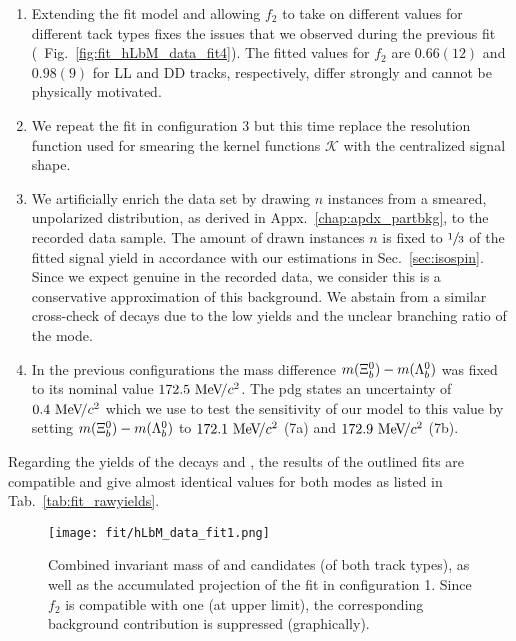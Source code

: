 \begin{enumerate}
    \item Extending the fit model and allowing $f_2$ to take on different values for different tack types fixes the issues that we observed during the previous fit (\cf{}~Fig.~\ref{fig:fit_hLbM_data_fit4}). The fitted values for $f_2$ are $0.66(12)$ and $0.98(9)$ for \gls{LL} and \gls{DD} tracks, respectively, differ strongly and cannot be physically motivated.
    \item We repeat the fit in configuration 3 but this time replace the resolution function used for smearing the \Dstarz kernel functions $\mathcal{K}$ with the centralized \Xibz signal shape.
    \item We artificially enrich the data set by drawing $n$ instances from a smeared, unpolarized \decay{\Lb}{\Dz\Sz} distribution, as derived in Appx.~\ref{chap:apdx_partbkg}, to the recorded data sample. The amount of drawn instances $n$ is fixed to $\sfrac{1}{3}$ of the fitted \Lb signal yield in accordance with our estimations in Sec.~\ref{sec:isospin}. Since we expect genuine \decay{\Lb}{\Dz\Sz} in the recorded data, we consider this is a conservative approximation of this background. We abstain from a similar cross-check of \decay{\Xibz}{\Dz\Sz} decays due to the low \decay{\Xibz}{\Dz\Lz} yields and the unclear branching ratio of the \Sz mode.
    \item In the previous configurations the mass difference $m({{\Xi}^0_{b}}) - m({{\Lambda}^0_{b}})$ was fixed to its nominal value $172.5\,{\mathrm{\,Me\kern -0.1em V\!/}c^2}$. The \gls{pdg} states an uncertainty of $0.4\,{\mathrm{\,Me\kern -0.1em V\!/}c^2}$ which we use to test the sensitivity of our model to this value by setting $m({{\Xi}^0_{b}}) - m({{\Lambda}^0_{b}})$ to $172.1\,{\mathrm{\,Me\kern -0.1em V\!/}c^2}$ (7a) and $172.9\,{\mathrm{\,Me\kern -0.1em V\!/}c^2}$ (7b).
\end{enumerate}
Regarding the yields of the decays \decay{\Lb}{\Dz\Lz} and \decay{\Xibz}{\Dz\Lz}, the results of the outlined fits are compatible and give almost identical values for both modes as listed in Tab.~\ref{tab:fit_rawyields}.

\begin{figure}[htbp]
    \centering
    \texttt{[image: fit/hLbM\_data\_fit1.png]}
    \caption{Combined invariant mass of \Dz and \Lz candidates (of both track types), as well as the accumulated projection of the fit in configuration 1. Since $f_2$ is compatible with one (at upper limit), the corresponding \Dstarz background contribution is suppressed (graphically).}
    \label{fig:fit_hLbM_data_fit1}
\end{figure}


